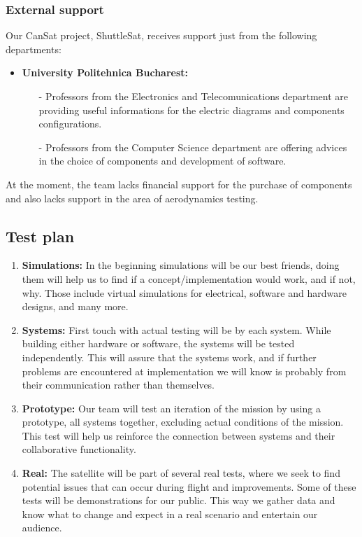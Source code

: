 \documentclass[11pt]{article}
\begin{document}
\subsubsection{External support}
\hspace{0.5cm} Our CanSat project, ShuttleSat, receives support just from the following departments:
\begin{itemize}
\item \textbf{University Politehnica Bucharest:} 
\begin{itemize}
\item[-] Professors from the Electronics and Telecomunications department are providing useful informations for the electric diagrams and components configurations.
\item[-] Professors from the Computer Science department are offering advices in the choice of components and development of software.
\end{itemize}
\end{itemize}

At the moment, the team lacks financial support for the purchase of components and also lacks support in the area of aerodynamics testing.

\subsection{Test plan}
\begin{enumerate}
    \item\textbf{Simulations:} {In the beginning simulations will be our best friends, doing them will help us to find if a concept/implementation would work, and if not, why. Those include virtual simulations for electrical, software and hardware designs, and many more.}
    \item\textbf{Systems:} {First touch with actual testing will be by each system. While building either hardware or software, the systems will be tested independently. This will assure that the systems work, and if further problems are encountered at implementation we will know is probably from their communication rather than themselves.}
    \item\textbf{Prototype:} {Our team will test an iteration of the mission by using a prototype, all systems together, excluding actual conditions of the mission. This test will help us reinforce the connection between systems and their collaborative functionality.}
    \item\textbf{Real:} {The satellite will be part of several real tests, where we seek to find potential issues that can occur during flight and improvements. Some of these tests will be demonstrations for our public. This way we gather data and know what to change and expect in a real scenario and entertain our audience.}
\end{enumerate}
\end{document}
